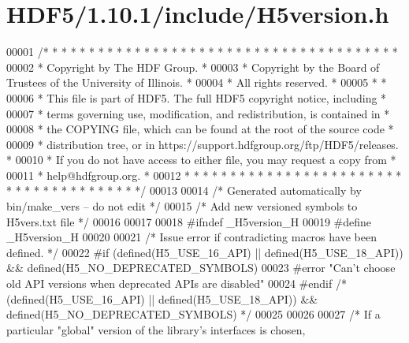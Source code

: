 \hypertarget{_h_d_f5_21_810_81_2include_2_h5version_8h_source}{}\section{H\+D\+F5/1.10.1/include/\+H5version.h}
\label{_h_d_f5_21_810_81_2include_2_h5version_8h_source}

\begin{DoxyCode}
00001 \textcolor{comment}{/* * * * * * * * * * * * * * * * * * * * * * * * * * * * * * * * * * * * * * *}
00002 \textcolor{comment}{ * Copyright by The HDF Group.                                               *}
00003 \textcolor{comment}{ * Copyright by the Board of Trustees of the University of Illinois.         *}
00004 \textcolor{comment}{ * All rights reserved.                                                      *}
00005 \textcolor{comment}{ *                                                                           *}
00006 \textcolor{comment}{ * This file is part of HDF5.  The full HDF5 copyright notice, including     *}
00007 \textcolor{comment}{ * terms governing use, modification, and redistribution, is contained in    *}
00008 \textcolor{comment}{ * the COPYING file, which can be found at the root of the source code       *}
00009 \textcolor{comment}{ * distribution tree, or in https://support.hdfgroup.org/ftp/HDF5/releases.  *}
00010 \textcolor{comment}{ * If you do not have access to either file, you may request a copy from     *}
00011 \textcolor{comment}{ * help@hdfgroup.org.                                                        *}
00012 \textcolor{comment}{ * * * * * * * * * * * * * * * * * * * * * * * * * * * * * * * * * * * * * * */}
00013 
00014 \textcolor{comment}{/* Generated automatically by bin/make\_vers -- do not edit */}
00015 \textcolor{comment}{/* Add new versioned symbols to H5vers.txt file */}
00016 
00017 
00018 \textcolor{preprocessor}{#ifndef \_H5version\_H}
00019 \textcolor{preprocessor}{#define \_H5version\_H}
00020 
00021 \textcolor{comment}{/* Issue error if contradicting macros have been defined. */}
00022 \textcolor{preprocessor}{#if (defined(H5\_USE\_16\_API) || defined(H5\_USE\_18\_API)) && defined(H5\_NO\_DEPRECATED\_SYMBOLS)}
00023 \textcolor{preprocessor}{  #error "Can't choose old API versions when deprecated APIs are disabled"}
00024 \textcolor{preprocessor}{#endif }\textcolor{comment}{/* (defined(H5\_USE\_16\_API) || defined(H5\_USE\_18\_API)) && defined(H5\_NO\_DEPRECATED\_SYMBOLS) */}\textcolor{preprocessor}{}
00025 
00026 
00027 \textcolor{comment}{/* If a particular "global" version of the library's interfaces is chosen,}

\end{DoxyCode}

